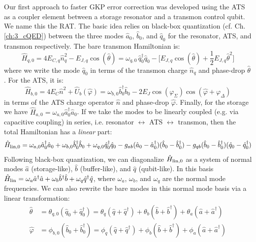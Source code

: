 Our first approach to faster GKP error correction was developed using the ATS as a coupler element between a storage resonator and a transmon control qubit. We name this the RAT. The basic idea relies on black-box quantization (cf. Ch. \ref{ch:3_cQED}) between the three modes $\hat{a}_0$, $\hat{b}_0$, and $\hat{q}_0$ for the resonator, ATS, and transmon respectively. The bare transmon Hamiltonian is:
\begin{equation}
\hat{H}_{q, 0} = 4E_{C,q}\hat{n}_q^2 - E_{J,q}\cos(\hat{\theta}) = \omega_{q,0}\,\hat{q}_0^\dagger \hat{q}_0 - \Big[E_{J,q}\cos(\hat{\theta}) + \frac{1}{2}E_{J,q} \hat{\theta}^2\Big] 
\end{equation}
where we write the mode $\hat{q}_0$ in terms of the transmon charge $\hat{n}_q$ and phase-drop $\hat{\theta}$. For the ATS, it is:
\begin{equation}
\hat{H}_{b,0} = 4E_C \hat{n}^2 + \hat{U}_b(\hat{\varphi}) = \omega_{b,0}\hat{b}_0^\dagger \hat{b}_0 - 2E_J \cos(\varphi_\Sigma)\cos(\hat{\varphi} + \varphi_\Delta)
\end{equation}
in terms of the ATS charge operator $\hat{n}$ and phase-drop $\hat{\varphi}$. Finally, for the storage we have $\hat{H}_{a, 0} = \omega_{a,0}\hat{a}_0^\dagger \hat{a}_0$. If we take the modes to be linearly coupled (e.g. via capacitive coupling) in series, i.e. resonator $\leftrightarrow$ ATS $\leftrightarrow$ transmon, then the total Hamiltonian has a \textit{linear} part:
\begin{equation}
\hat{H}_{\rm lin, 0} = \omega_{a,0}\hat{a}_0^\dagger \hat{a}_0 + \omega_{b,0}\hat{b}_0^\dagger \hat{b}_0 + \omega_{q,0}\hat{q}_0^\dagger \hat{q}_0 - g_{ab}(\hat{a}_0 - \hat{a}_0^\dagger)(\hat{b}_0 - \hat{b}_0^\dagger) - g_{qb}(\hat{b}_0 - \hat{b}_0^\dagger)(\hat{q}_0 - \hat{q}_0^\dagger)
\end{equation}
Following black-box quantization, we can diagonalize $\hat{H}_{\rm lin, 0}$ as a system of normal modes $\hat{a}$ (storage-like), $\hat{b}$ (buffer-like), and $\hat{q}$ (qubit-like). In this basis $\hat{H}_{\rm lin} = \omega_a \hat{a}^\dagger\hat{a} + \omega_b \hat{b}^\dagger\hat{b} + \omega_q \hat{q}^\dagger\hat{q}$, where $\omega_a$, $\omega_b$, and $\omega_q$ are the normal mode frequencies. We can also rewrite the bare modes in this normal mode basis via a linear transformation:
\begin{align}
\hat{\theta} &= \theta_{q, 0}(\hat{q}_0 + \hat{q}_0^\dagger) = \theta_q(\hat{q} + \hat{q}^\dagger) + \theta_b(\hat{b} + \hat{b}^\dagger) + \theta_a(\hat{a} + \hat{a}^\dagger) \\
\hat{\varphi} &= \phi_{b, 0}(\hat{b}_0 + \hat{b}_0^\dagger) = \phi_q(\hat{q} + \hat{q}^\dagger) + \phi_b(\hat{b} + \hat{b}^\dagger) + \phi_a(\hat{a} + \hat{a}^\dagger)
\end{align}
